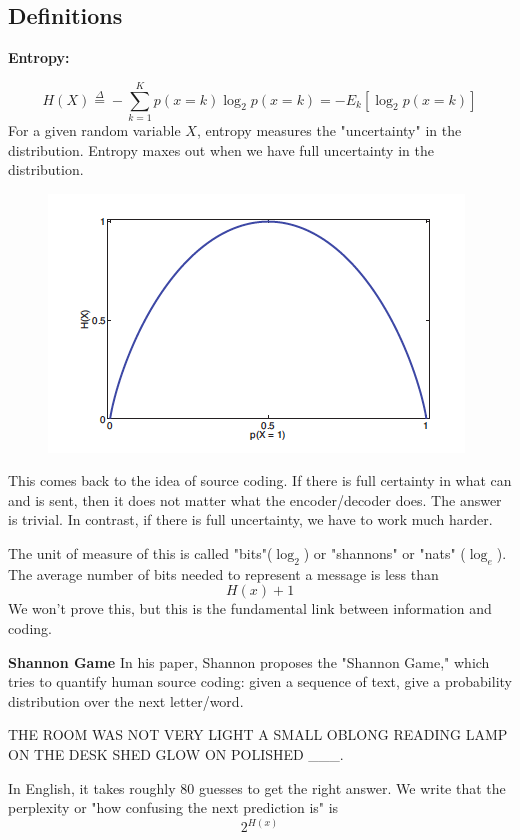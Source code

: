 \documentclass{article}
\begin{document}
\subsection{Definitions}

\textbf{Entropy:}

$$H(X) \overset{\Delta}{=}  - \sum_{k=1}^K p(x=k) \log_2 p(x = k) = -E_k[\log_2 p(x=k)]$$
For a given random variable $X$, entropy measures the "uncertainty" in the distribution. Entropy maxes out when we have full uncertainty in the distribution. 

\begin{figure}[h!]
\centering
\includegraphics[scale=0.45]{parabola.png}
\label{fig:univerise}
\end{figure}

\pagebreak
\smallskip
This comes back to the idea of source coding. If there is full certainty in what can and is sent, then it does not matter what the encoder/decoder does. The answer is trivial. In contrast, if there is full uncertainty, we have to work much harder.

\smallskip
The unit of measure of this is called "bits"($\log_2$) or "shannons" or "nats" ($\log_e$). The average number of bits needed to represent a message is less than $$H(x) + 1$$ We won't prove this, but this is the fundamental link between information and coding.

\smallskip
\smallskip
\textbf{Shannon Game}
In his paper, Shannon proposes the "Shannon Game," which tries to quantify human source coding: given a sequence of text, give a probability distribution over the next letter/word.

\smallskip
THE ROOM WAS NOT VERY LIGHT A SMALL OBLONG READING LAMP ON THE DESK SHED GLOW ON POLISHED \_\_\_.

\smallskip
\smallskip
In English, it takes roughly 80 guesses to get the right answer. We write that the perplexity or "how confusing the next prediction is" is
$$2^{H(x)}$$
\end{document}
